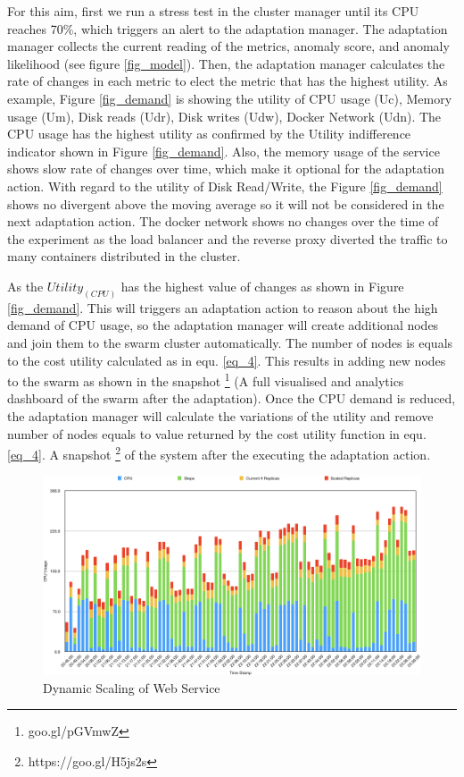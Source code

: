\documentclass[sigconf]{acmart}
\begin{document}
For this aim, first we run a stress test in the cluster manager until its CPU reaches 70\%, which triggers an alert to the adaptation manager. The adaptation manager collects the current reading of the metrics, anomaly score, and anomaly likelihood (see figure \ref{fig_model}). Then, the adaptation manager calculates the rate of changes in each metric to elect the metric that has the highest utility. As example, Figure \ref{fig_demand} is showing the utility of CPU usage (Uc), Memory usage (Um), Disk reads (Udr), Disk writes (Udw), Docker Network (Udn). The CPU usage has the highest utility as confirmed by the Utility indifference indicator shown in Figure \ref{fig_demand}. Also, the memory usage of the service shows slow rate of changes over time, which make it optional for the adaptation action. With regard to the utility of Disk Read/Write, the Figure \ref{fig_demand} shows no divergent above the moving average so it will not be considered in the next adaptation action. The docker network shows no changes over the time of the experiment as the load balancer and the reverse proxy diverted the traffic to many containers distributed in the cluster. 

As the $Utility_(CPU)$ has the highest value of changes as shown in Figure \ref{fig_demand}. This will triggers an adaptation action to reason about the high demand of CPU usage, so the adaptation manager will create additional nodes and join them to the swarm cluster automatically. The number of nodes is equals to the cost utility calculated as in equ. \ref{eq_4}. This results in adding new nodes to the swarm as shown in the snapshot \footnote{goo.gl/pGVmwZ} (A full visualised and analytics dashboard of the swarm after the adaptation).
Once the CPU demand is reduced, the adaptation manager will calculate the variations of the utility and remove number of nodes equals to value returned by the cost utility function in equ. \ref{eq_4}. A snapshot \footnote{https://goo.gl/H5js2s} of the system after the executing the adaptation action. 
\begin{figure}[ht!]   
\includegraphics[scale=0.38]{ScalingService}
\caption{ Dynamic Scaling of Web Service}
\label{fig_Scale}
\end{figure} 
\end{document}
